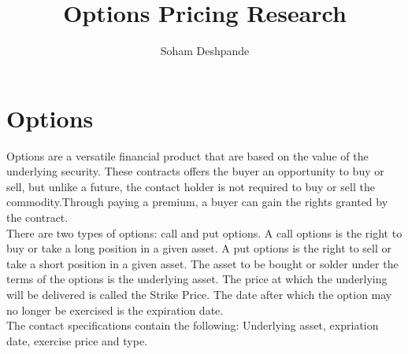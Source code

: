 \documentclass[12pt]{article}
\begin{document}
\title{Options Pricing Research }
\author{Soham Deshpande}
\maketitle
\clearpage
\tableofcontents
\clearpage

\section{Options}
Options are a versatile financial product that are based on the value of the 
underlying security. These contracts offers the buyer an opportunity to buy or
sell, but unlike a future, the contact holder is not required to buy or sell the 
commodity.Through paying a premium, a buyer can gain the rights granted by the
contract.
\\
There are two types of options: call and put options. A call options is the
right to buy
or take a long position in a given asset. A put options is the right to sell or
take a short position in a given asset. The asset to be bought or solder under
the terms of the options is the underlying asset. The price at which the
underlying will be delivered is called the Strike Price. The date after which the
option may no longer be exercised is the expiration date.
\\
The contact specifications contain the following: Underlying asset, expriation
date, exercise price and type. 
 
\end{document}
